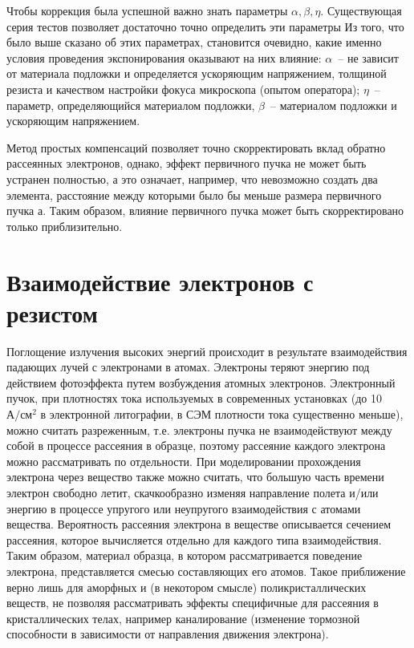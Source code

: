 Чтобы коррекция была успешной важно знать параметры $\alpha,\beta,\eta$. Существующая серия тестов позволяет достаточно точно определить эти параметры Из того, что было выше сказано об этих параметрах, становится очевидно, какие именно условия проведения экспонирования оказывают на них влияние: $\alpha$~-- не зависит от материала подложки и определяется ускоряющим напряжением, толщиной резиста и качеством настройки фокуса микроскопа (опытом оператора); $\eta$~-- параметр, определяющийся материалом подложки, $\beta$~-- материалом подложки и ускоряющим напряжением.

Метод простых компенсаций позволяет точно скорректировать вклад обратно рассеянных электронов, однако, эффект первичного пучка не может быть устранен полностью, а это означает, например, что невозможно создать два элемента, расстояние между которыми было бы меньше размера первичного пучка а. Таким образом, влияние первичного пучка может быть скорректировано только приблизительно.

\section{Взаимодействие электронов с резистом}

Поглощение излучения высоких энергий происходит в результате взаимодействия падающих лучей с электронами в атомах. Электроны теряют энергию под действием фотоэффекта путем возбуждения атомных электронов.
Электронный пучок, при плотностях тока используемых в современных установках (до 10 $\text{А}/\text{см}^2$ в электронной литографии, в СЭМ плотности тока существенно меньше), можно считать разреженным, т.е. электроны пучка не взаимодействуют между собой в процессе рассеяния в образце, поэтому рассеяние каждого электрона можно рассматривать по отдельности.
При моделировании прохождения электрона через вещество также можно считать, что большую часть времени электрон свободно летит, скачкообразно изменяя направление полета и/или энергию в процессе упругого или неупругого взаимодействия с атомами вещества. Вероятность рассеяния электрона в веществе описывается сечением рассеяния, которое вычисляется отдельно для каждого типа взаимодействия.
Таким образом, материал образца, в котором рассматривается поведение электрона, представляется смесью составляющих его атомов. Такое приближение верно лишь для аморфных и (в некотором смысле) поликристаллических веществ, не позволяя рассматривать эффекты специфичные для рассеяния в кристаллических телах, например каналирование (изменение тормозной способности в зависимости от направления движения электрона).

